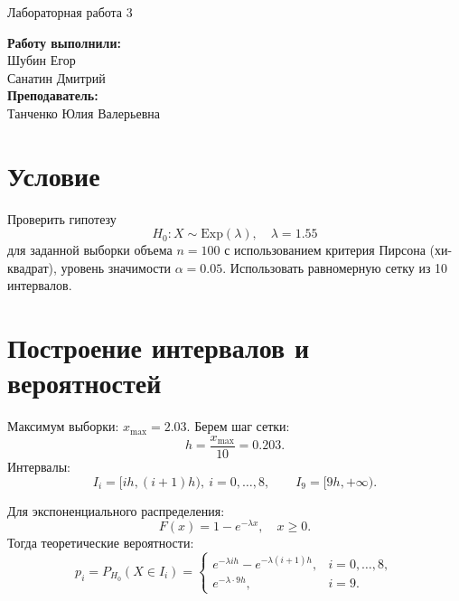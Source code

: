 \documentclass[12pt,a4paper]{article}
\begin{document}
\begin{center}
    {\LARGE Лабораторная работа 3}
\end{center}
\begin{flushright}
\textbf{Работу выполнили:} \\
Шубин Егор\\
Санатин Дмитрий\\
\textbf{Преподаватель:} \\
Танченко Юлия Валерьевна
\end{flushright}



\section*{Условие}
Проверить гипотезу
\[
H_0: X \sim \mathrm{Exp}(\lambda), \quad \lambda = 1.55
\]
для заданной выборки объема $n=100$ с использованием критерия Пирсона (хи-квадрат),
уровень значимости $\alpha = 0.05$. Использовать равномерную сетку из 10 интервалов.

\section*{Построение интервалов и вероятностей}
Максимум выборки: $x_{\max}=2.03$.  
Берем шаг сетки:
\[
h = \frac{x_{\max}}{10} = 0.203.
\]
Интервалы:
\[
I_i=[ih, (i+1)h),\ i=0,\dots,8, \qquad I_9=[9h, +\infty).
\]

Для экспоненциального распределения:
\[
F(x)=1-e^{-\lambda x}, \quad x\ge 0.
\]
Тогда теоретические вероятности:
\[
p_i=P_{H_0}(X\in I_i)=
\begin{cases}
e^{-\lambda ih}-e^{-\lambda (i+1)h}, & i=0,\dots,8,\\
e^{-\lambda \cdot 9h}, & i=9.
\end{cases}
\]
\end{document}
